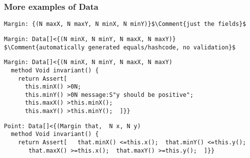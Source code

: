 \begin{frame}[fragile]
\frametitle{More examples of Data}
\begin{NiceCode}{59ex}{0.8}
\begin{lstlisting}
Margin: {(N maxX, N maxY, N minX, N minY)}$\Comment{just the fields}$
\end{lstlisting}
\end{NiceCode}
\pause
\begin{NiceCode}{59ex}{0.8}
\begin{lstlisting}
Margin: Data[]<{(N minX, N minY, N maxX, N maxY)}
$\Comment{automatically generated equals/hashcode, no validation}$
\end{lstlisting}
\end{NiceCode}
\begin{NiceCode}{59ex}{0.8}
\begin{lstlisting}
Margin: Data[]<{(N minX, N minY, N maxX, N maxY)
  method Void invariant() {
    return Assert[
      this.minX() >0N;
      this.minY() >0N message:S"y should be positive";
      this.maxX() >this.minX();
      this.maxY() >this.minY();  ]}}
\end{lstlisting}
\end{NiceCode}
\begin{NiceCode}{59ex}{0.8}
\begin{lstlisting}
Point: Data[]<{(Margin that,  N x, N y)
  method Void invariant() {
    return Assert[   that.minX() <=this.x();  that.minY() <=this.y();
       that.maxX() >=this.x();  that.maxY() >=this.y();  ]}}
\end{lstlisting}
\end{NiceCode}

\end{frame}



